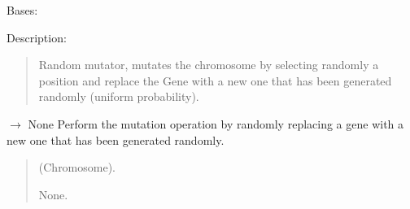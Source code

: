 \documentclass[letterpaper,10pt,english]{sphinxmanual}
\begin{document}
\begin{fulllineitems}
\label{\detokenize{pygenalgo.operators.mutation:pygenalgo.operators.mutation.random_mutator.RandomMutator}}
\pysigstartsignatures
\pysiglinewithargsret
{}
{}
{}
\pysigstopsignatures
\sphinxAtStartPar
Bases: {\hyperref[\detokenize{pygenalgo.operators.mutation:pygenalgo.operators.mutation.mutate_operator.MutationOperator}]{}}

\sphinxAtStartPar
Description:
\begin{quote}

\sphinxAtStartPar
Random mutator, mutates the chromosome by selecting randomly a position and replace
the Gene with a new one that has been generated randomly (uniform probability).
\end{quote}

\begin{fulllineitems}
\label{\detokenize{pygenalgo.operators.mutation:pygenalgo.operators.mutation.random_mutator.RandomMutator.mutate}}
\pysigstartsignatures
\pysiglinewithargsret
{}
{}
{{ $\rightarrow$ None}}
\pysigstopsignatures
\sphinxAtStartPar
Perform the mutation operation by randomly replacing a gene
with a new one that has been generated randomly.
\begin{quote}\begin{description}
\sphinxAtStartPar
{} \textendash{} (Chromosome).

\sphinxAtStartPar
None.

\end{description}\end{quote}

\end{fulllineitems}


\end{fulllineitems}
\end{document}
